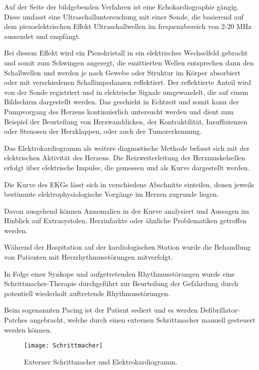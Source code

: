 \documentclass[11pt,a4paper,titlepage]{scrartcl}
\begin{document}
Auf der Seite der bildgebenden Verfahren ist eine Echokardiographie gängig.
Diese umfasst eine Ultraschalluntersuchung mit einer Sonde, die basierend auf dem piezoelektrischen Effekt Ultraschallwellen im frequenzbereich von 2-20 MHz aussendet und empfängt. \medskip
    
Bei diesem Effekt wird ein Piezokristall in ein elektrisches Wechselfeld gebracht und somit zum Schwingen angeregt, die emittierten Wellen entsprechen dann den Schallwellen und werden je nach Gewebe oder Struktur im Körper absorbiert oder mit verschiedenen Schallimpedanzen reflektiert. Der reflektierte Anteil wird von der Sonde registriert und in elektrische Signale umgewandelt, die auf einem Bildschirm dargestellt werden. Das geschieht in Echtzeit und somit kann der Pumpvorgang des Herzens kontinuierlich untersucht werden und dient zum Beispiel der Beurteilung von Herzwanddicken, der Kontraktilität, Insuffizienzen oder Stenosen der Herzklappen, oder auch der Tumorerkennung. \medskip
    
Das Elektrokardiogramm als weitere diagnostische Methode befasst sich mit der elektrischen Aktivität des Herzens.
Die Reizweiterleitung der Herzmuskelzellen erfolgt über elektrische Impulse, die gemessen und als Kurve dargestellt werden. \medskip
    
Die Kurve des EKGs lässt sich in verschiedene Abschnitte einteilen, denen jeweils bestimmte elektrophysiologische Vorgänge im Herzen zugrunde liegen. \medskip
    
Davon ausgehend können Annomalien in der Kurve analysiert und Aussagen im Hinblick auf Extrasystolen, Herzinfarkte oder ähnliche Problematiken getroffen werden.\medskip
    
Während der Hospitation auf der kardiologischen Station wurde die Behandlung von Patienten mit Herzrhythmusstörungen mitverfolgt. \medskip
    
In Folge einer Synkope und aufgetretenden Rhythmusstörungen wurde eine Schrittmacher-Therapie durchgeführt zur Beurteilung der Gefährdung durch potentiell wiederholt auftretende Rhythmusstörungen. \medskip
    
Beim sogenannten Pacing ist der Patient sediert und es werden Defibrillator-Patches angebracht, welche durch einen externen Schrittmacher manuell gesteuert werden können. \medskip
    
    \begin{figure}
        \centering
        \texttt{[image: Schrittmacher]}
        \caption{Externer Schrittmacher und Elektrokardiogramm.}
        \label{pacing}
        \centering
        \end{figure}
\end{document}

